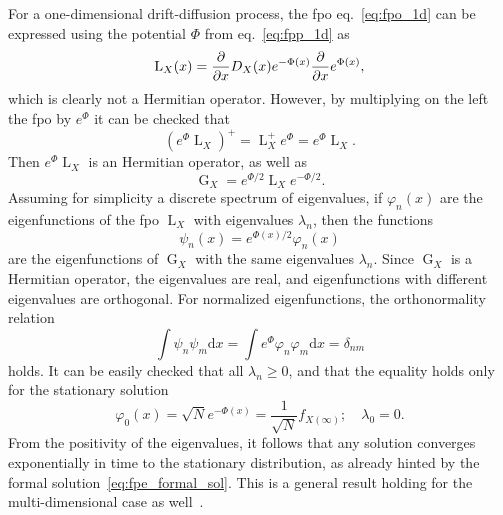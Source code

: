 \documentclass[a4paper,12pt]{book}
\begin{document}
For a one-dimensional drift-diffusion process, the \acrshort{fpo} eq.~\eqref{eq:fpo_1d} can be expressed using the potential $\Phi$ from eq.~\eqref{eq:fpp_1d} as
\begin{equation}
    \operatorname{L}_X(x) = \pdv{}{x} D_X(x) e^{-\Phi(x)} \pdv{}{x}e^{\Phi(x)},
\end{equation}
which is clearly not a Hermitian operator. However, by multiplying on the left the \acrshort{fpo} by $e^\Phi$ it can be checked that
\begin{equation}
    (e^\Phi \operatorname{L}_X )^+ = \operatorname{L}_X^+ e^\Phi = e^\Phi \operatorname{L}_X.
\end{equation}
Then $e^\Phi \operatorname{L}_X$ is an Hermitian operator, as well as
\begin{equation}
\label{eq:fpo_herm}
    \operatorname{G}_X = e^{\Phi/2} \operatorname{L}_X e^{-\Phi/2}. 
\end{equation}
Assuming for simplicity a discrete spectrum of eigenvalues, if $\varphi_n(x)$ are the eigenfunctions of the \acrshort{fpo} $\operatorname{L}_X$ with eigenvalues $\lambda_n$, then the functions
\begin{equation}
    \psi_n (x) = e^{\Phi(x)/2} \varphi_n (x)
\end{equation}
are the eigenfunctions of $\operatorname{G}_X$ with the same eigenvalues $\lambda_n$. Since $\operatorname{G}_X$ is a Hermitian operator, the eigenvalues are real, and eigenfunctions with different eigenvalues are orthogonal. For normalized eigenfunctions, the orthonormality relation
\begin{equation}
    \int \psi_n \psi_m \mathrm{d}x = \int e^{\Phi}\varphi_n \varphi_m \mathrm{d}x = \delta_{nm}
\end{equation}
holds. It can be easily checked that all $\lambda_n \geq 0$, and that the equality holds only for the stationary solution
\begin{equation}
    \varphi_0(x) = \sqrt{N} e^{-\Phi(x)} = \frac{1}{\sqrt{N}}f_{X(\infty)};
    \quad \lambda_0 = 0.
\end{equation}
From the positivity of the eigenvalues, it follows that any solution converges exponentially in time to the stationary distribution, as already hinted by the formal solution~\eqref{eq:fpe_formal_sol}. This is a general result holding for the multi-dimensional case as well~\parencite{ji_convergence_2019}.\\
\end{document}
